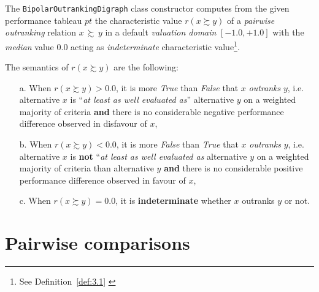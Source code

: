 The \texttt{BipolarOutrankingDigraph} class constructor computes from the given performance tableau $pt$ the characteristic value $r(x \succsim y)$ of a \emph{pairwise outranking} relation $x\, \succsim \,y$ in a default \emph{valuation domain} $[-1.0,+1.0]$ with the {\em median\/} value $0.0$ acting as \emph{indeterminate} characteristic value\footnote{See Definition~\vref{def:3.1} \citep{BIS-2013}}. 

\begin{definition}\label{def:3.1}

\noindent The semantics of $r(x \succsim y)$ are the following:
\begin{itemize}[nosep]
\item [a.] When $r(x \succsim y) > 0.0$, it is more {\em True\/} than {\em False\/} that $x$ \emph{outranks} $y$, i.e. alternative $x$ is ``\emph{at least as well evaluated as}'' alternative $y$ on a weighted majority of criteria {\bf and} there is no considerable negative performance difference observed in disfavour of $x$,
\item [b.] When $r(x \succsim y) < 0.0$, it is more {\em False\/} than {\em True\/} that $x$ \emph{outranks} $y$, i.e. alternative $x$ is {\bf not} ``\emph{at least as well evaluated as} alternative $y$ on a weighted majority of criteria than alternative $y$ {\bf and} there is no considerable positive performance difference observed in favour of $x$,
\item [c.] When $r(x \succsim y) = 0.0$, it is {\bf indeterminate} whether $x$ outranks $y$ or not.
\end{itemize}
\end{definition}

\section{Pairwise comparisons}
\label{sec:3.3}

